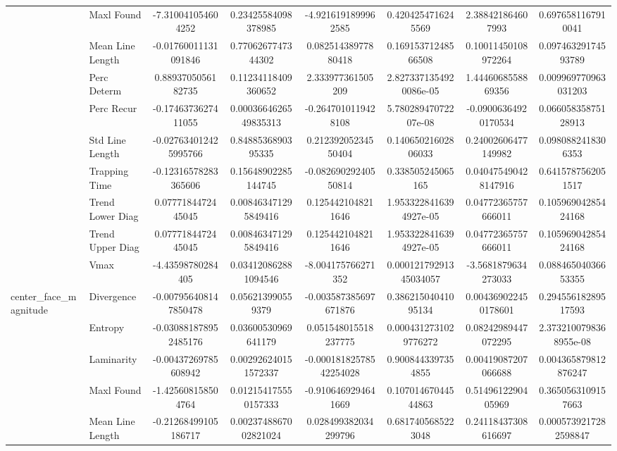 \begin{tabular}{llcc|cc|cc}
 & Maxl Found & -7.310041054604252 & 0.23425584098378985 & -4.9216191899962585 & 0.4204254716245569 & 2.388421864607993 & 0.6976581167910041 \\
 & Mean Line Length & -0.01760011131091846 & 0.7706267747344302 & 0.08251438977880418 & 0.16915371248566508 & 0.10011450108972264 & 0.09746329174593789 \\
 & Perc Determ & 0.8893705056182735 & 0.11234118409360652 & 2.333977361505209 & 2.8273371354920086e-05 & 1.4446068558869356 & 0.009969770963031203 \\
 & Perc Recur & -0.1746373627411055 & 0.0003664626549835313 & -0.2647010119428108 & 5.78028947072207e-08 & -0.09006364920170534 & 0.06605835875128913 \\
 & Std Line Length & -0.027634012425995766 & 0.8488536890395335 & 0.21239205234550404 & 0.14065021602806033 & 0.24002606477149982 & 0.0980882418306353 \\
 & Trapping Time & -0.12316578283365606 & 0.15648902285144745 & -0.08269029240550814 & 0.338505245065165 & 0.040475490428147916 & 0.6415787562051517 \\
 & Trend Lower Diag & 0.0777184472445045 & 0.008463471295849416 & 0.1254421048211646 & 1.9533228416394927e-05 & 0.04772365757666011 & 0.10596904285424168 \\
 & Trend Upper Diag & 0.0777184472445045 & 0.008463471295849416 & 0.1254421048211646 & 1.9533228416394927e-05 & 0.04772365757666011 & 0.10596904285424168 \\
 & Vmax & -4.43598780284405 & 0.034120862881094546 & -8.004175766271352 & 0.00012179291345034057 & -3.5681879634273033 & 0.08846504036653355 \\
\midrule
\multirow{12}{*}{center_face_magnitude} & Divergence & -0.007956408147850478 & 0.056213990559379 & -0.003587385697671876 & 0.38621504041095134 & 0.004369022450178601 & 0.29455618289517593 \\
 & Entropy & -0.030881878952485176 & 0.03600530969641179 & 0.051548015518237775 & 0.0004312731029776272 & 0.08242989447072295 & 2.3732100798368955e-08 \\
 & Laminarity & -0.00437269785608942 & 0.002926240151572337 & -0.00018182578542254028 & 0.9008443397354855 & 0.00419087207066688 & 0.004365879812876247 \\
 & Maxl Found & -1.425608158504764 & 0.012154175550157333 & -0.9106469294641669 & 0.10701467044544863 & 0.5149612290405969 & 0.3650563109157663 \\
 & Mean Line Length & -0.21268499105186717 & 0.0023748867002821024 & 0.028499382034299796 & 0.6817405685223048 & 0.24118437308616697 & 0.0005739217282598847 \\

\end{tabular}
